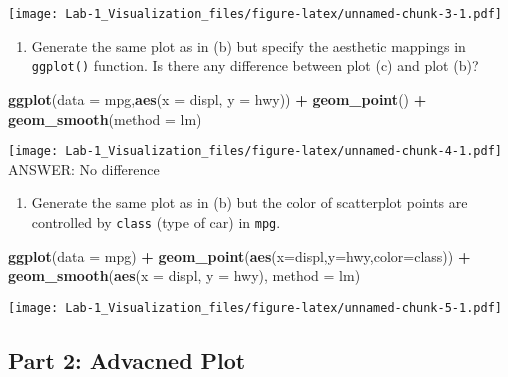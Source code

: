 \documentclass[]{article}
\newenvironment{Shaded}{\begin{snugshade}}{\end{snugshade}}
\newcommand{\DataTypeTok}[1]{\textcolor[rgb]{0.13,0.29,0.53}{#1}}
\newcommand{\KeywordTok}[1]{\textcolor[rgb]{0.13,0.29,0.53}{\textbf{#1}}}
\newcommand{\NormalTok}[1]{#1}
\newcommand{\OperatorTok}[1]{\textcolor[rgb]{0.81,0.36,0.00}{\textbf{#1}}}
\newcommand{\StringTok}[1]{\textcolor[rgb]{0.31,0.60,0.02}{#1}}
\providecommand{\tightlist}{%
  \setlength{\itemsep}{0pt}\setlength{\parskip}{0pt}}
\begin{document}
\texttt{[image: Lab-1\_Visualization\_files/figure-latex/unnamed-chunk-3-1.pdf]}

\begin{enumerate}
\def\labelenumi{\alph{enumi}.}
\setcounter{enumi}{2}
\tightlist
\item
  Generate the same plot as in (b) but specify the aesthetic mappings in
  \texttt{ggplot()} function. Is there any difference between plot (c)
  and plot (b)?
\end{enumerate}

\begin{Shaded}
\begin{Highlighting}[]
\KeywordTok{ggplot}\NormalTok{(}\DataTypeTok{data =}\NormalTok{ mpg,}\KeywordTok{aes}\NormalTok{(}\DataTypeTok{x =}\NormalTok{ displ, }\DataTypeTok{y =}\NormalTok{ hwy)) }\OperatorTok{+}
\StringTok{  }\KeywordTok{geom_point}\NormalTok{() }\OperatorTok{+}
\StringTok{    }\KeywordTok{geom_smooth}\NormalTok{(}\DataTypeTok{method =}\NormalTok{ lm)}
\end{Highlighting}
\end{Shaded}

\texttt{[image: Lab-1\_Visualization\_files/figure-latex/unnamed-chunk-4-1.pdf]}
ANSWER: No difference

\begin{enumerate}
\def\labelenumi{\alph{enumi}.}
\setcounter{enumi}{3}
\tightlist
\item
  Generate the same plot as in (b) but the color of scatterplot points
  are controlled by \texttt{class} (type of car) in \texttt{mpg}.
\end{enumerate}

\begin{Shaded}
\begin{Highlighting}[]
\KeywordTok{ggplot}\NormalTok{(}\DataTypeTok{data =}\NormalTok{ mpg) }\OperatorTok{+}
\StringTok{    }\KeywordTok{geom_point}\NormalTok{(}\KeywordTok{aes}\NormalTok{(}\DataTypeTok{x=}\NormalTok{displ,}\DataTypeTok{y=}\NormalTok{hwy,}\DataTypeTok{color=}\NormalTok{class)) }\OperatorTok{+}
\StringTok{  }\KeywordTok{geom_smooth}\NormalTok{(}\KeywordTok{aes}\NormalTok{(}\DataTypeTok{x =}\NormalTok{ displ, }\DataTypeTok{y =}\NormalTok{ hwy), }\DataTypeTok{method =}\NormalTok{ lm)}
\end{Highlighting}
\end{Shaded}

\texttt{[image: Lab-1\_Visualization\_files/figure-latex/unnamed-chunk-5-1.pdf]}

\hypertarget{part-2-advacned-plot}{%
\subsection{Part 2: Advacned Plot}\label{part-2-advacned-plot}}
\end{document}
